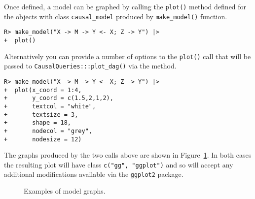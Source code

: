 \documentclass[
  11pt,
  article]{jss}
\begin{document}
Once defined, a model can be graphed by calling the \texttt{plot()}
method defined for the objects with class \texttt{causal\_model}
produced by \texttt{make\_model()} function.

\begin{verbatim}
R> make_model("X -> M -> Y <- X; Z -> Y") |>
+  plot()
\end{verbatim}

Alternatively you can provide a number of options to the \texttt{plot()}
call that will be passed to \texttt{CausalQueries:::plot\_dag()} via the
method.

\begin{verbatim}
R> make_model("X -> M -> Y <- X; Z -> Y") |>
+  plot(x_coord = 1:4,
+       y_coord = c(1.5,2,1,2),
+       textcol = "white",
+       textsize = 3,
+       shape = 18,
+       nodecol = "grey",
+       nodesize = 12)
\end{verbatim}

The graphs produced by the two calls above are shown in
Figure~\ref{fig-plots}. In both cases the resulting plot will have class
\texttt{c("gg",\ "ggplot")} and so will accept any additional
modifications available via the \texttt{ggplot2} package.

\begin{figure}

\begin{minipage}[t]{0.50\linewidth}

{\centering 


}

\end{minipage}%
%
\begin{minipage}[t]{0.50\linewidth}

{\centering 


}

\end{minipage}%

\caption{\label{fig-plots}Examples of model graphs.}

\end{figure}
\end{document}
